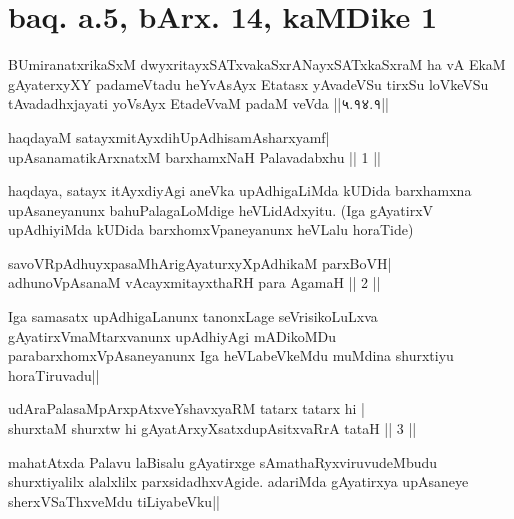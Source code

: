 \section*{baq. a.5, bArx. 14, kaMDike 1}

\begin{shl}
BUmiranatxrikaSxM dwyxritayxSATxvakaSxrANayxSATxkaSxraM ha vA EkaM gAyaterxyXY padameVtadu heYvAsAyx Etatasx yAvadeVSu tirxSu loVkeVSu tAvadadhxjayati yoV\s sAyx EtadeVvaM padaM veVda ||५.१४.१||
\end{shl}

\stext


\begin{shl}
haqdayaM satayxmitAyxdihUpAdhisamAsharxyamf| \\
upAsanamatikArxnatxM barxhamxNaH Palavadabxhu \hfill ||  1 || 
\end{shl}

\begin{artha}
haqdaya, satayx itAyxdiyAgi aneVka upAdhigaLiMda kUDida barxhamxna 
upAsaneyanunx bahuPalagaLoMdige heVLidAdxyitu. (Iga gAyatirxV 
upAdhiyiMda kUDida barxhomxVpaneyanunx heVLalu horaTide)
\end{artha}

\begin{shl}
savoVRpAdhuyxpasaMhArigAyaturxyXpAdhikaM parxBoVH| \\
adhunoVpAsanaM vAcayxmitayxthaRH para AgamaH \hfill ||  2 || 
\end{shl}

\begin{artha}
Iga samasatx upAdhigaLanunx tanonxLage seVrisikoLuLxva 
gAyatirxVmaMtarxvanunx upAdhiyAgi mADikoMDu parabarxhomxVpAsaneyanunx 
Iga heVLabeVkeMdu muMdina shurxtiyu horaTiruvadu||
\end{artha}


\begin{shl}
udAraPalasaMpArxpAtxveYshavxyaRM tatarx tatarx hi | \\
shurxtaM shurxtw hi gAyatArxyXsatxdupAsitxvaRrA tataH \hfill ||  3 || 
\end{shl}

\begin{artha} 
mahatAtxda Palavu laBisalu gAyatirxge sAmathaRyxviruvudeMbudu 
shurxtiyalilx alalxlilx parxsidadhxvAgide. adariMda gAyatirxya 
upAsaneye sherxVSaThxveMdu tiLiyabeVku||
\end{artha}

